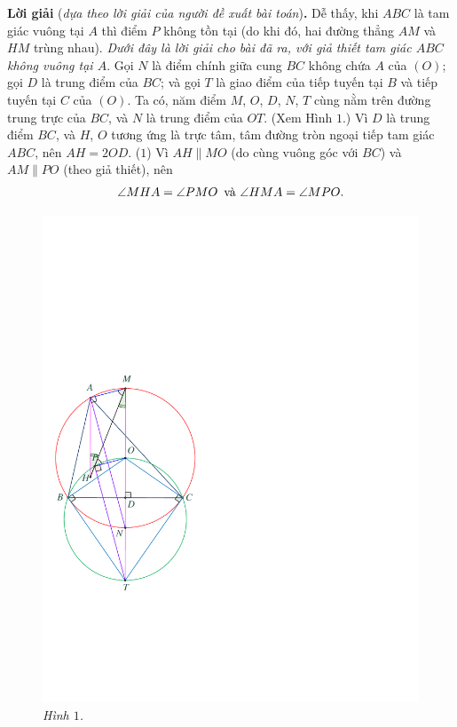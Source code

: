 \begin{multicols}{2}
	\vskip 0.05cm
	\textbf{\color{thachthuctoanhoc}Lời giải} (\textit{dựa theo lời giải của người đề xuất bài toán})\textbf{\color{thachthuctoanhoc}.}
	\vskip 0.05cm
	Dễ thấy, khi $ABC$ là tam giác vuông tại $A$ thì điểm $P$ không tồn tại (do khi đó, hai đường thẳng $AM$ và $HM$ trùng nhau). \textit{Dưới đây là lời giải cho bài đã ra, với giả thiết tam giác $ABC$ không vuông tại $A$}.
	\vskip 0.05cm
	Gọi $N$ là điểm chính giữa cung $BC$ không chứa $A$ của $(O)$; gọi $D$ là trung điểm của $BC$; và gọi $T$ là giao điểm của tiếp tuyến tại $B$ và tiếp tuyến tại $C$ của $(O)$. Ta có, năm điểm $M$, $O$, $D$, $N$, $T$ cùng nằm trên đường trung trực của $BC$, và $N$ là trung điểm của $OT$. (Xem Hình $1$.)
	\vskip 0.05cm
	Vì $D$ là trung điểm $BC$, và $H$, $O$ tương ứng là trực tâm, tâm đường tròn ngoại tiếp tam giác $ABC$, nên $AH = 2OD$. \hfill ($1$)
	\vskip 0.05cm
	Vì $AH \parallel MO$ (do cùng vuông góc với $BC$) và $AM \parallel PO$ (theo giả thiết), nên
	\begin{align*}
		\angle MHA = \angle PMO \text{\color{black}\, và } \angle HMA = \angle MPO.
	\end{align*}
	\begin{figure}[H]
		\centering
		\captionsetup{labelformat= empty, justification=centering}
		\includegraphics[width=0.68\linewidth]{P619H1}
		\caption{\small\textit{\color{thachthuctoanhoc}Hình $1$.}}
		\vspace*{-15pt}
	\end{figure}

\end{multicols}
